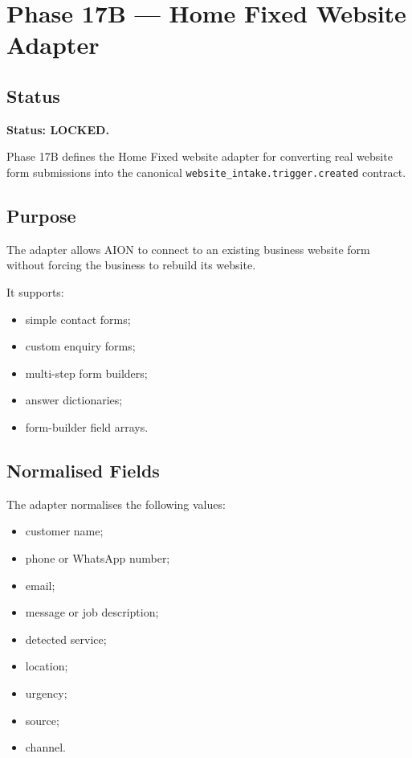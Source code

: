 \section{Phase 17B --- Home Fixed Website Adapter}
\label{sec:aion-phase17b-home-fixed-website-adapter}

\subsection{Status}

\textbf{Status: LOCKED.}

Phase 17B defines the Home Fixed website adapter for converting real website form submissions into the canonical \texttt{website\_intake.trigger.created} contract.

\subsection{Purpose}

The adapter allows AION to connect to an existing business website form without forcing the business to rebuild its website.

It supports:

\begin{itemize}
  \item simple contact forms;
  \item custom enquiry forms;
  \item multi-step form builders;
  \item answer dictionaries;
  \item form-builder field arrays.
\end{itemize}

\subsection{Normalised Fields}

The adapter normalises the following values:

\begin{itemize}
  \item customer name;
  \item phone or WhatsApp number;
  \item email;
  \item message or job description;
  \item detected service;
  \item location;
  \item urgency;
  \item source;
  \item channel.
\end{itemize}

